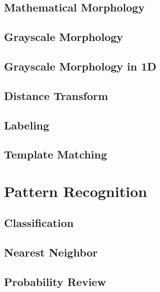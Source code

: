 \documentclass{book}
\begin{document}
\chapter{Mathematical Morphology}


\chapter{Grayscale Morphology}


\chapter{Grayscale Morphology in 1D}


\chapter{Distance Transform}


\chapter{Labeling}


\chapter{Template Matching}


\part{Pattern Recognition}

\chapter{Classification}


\chapter{Nearest Neighbor}


\chapter{Probability Review}

\end{document}
